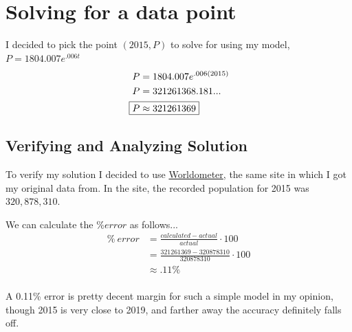 \documentclass[12pt]{article}
\begin{document}
\section{Solving for a data point}
I decided to pick the point $(2015, P)$ to solve for using my model, $P=1804.007e^{.006t}$
\begin{align}
  P         & =1804.007e^{.006\left(2015\right)} \\
  P         & =321261368.181...                  \\
  \Aboxed{P & \approx321261369}
\end{align}
\setcounter{equation}{0}

\subsection{Verifying and Analyzing Solution}
To verify my solution I decided to use \href{https://www.worldometers.info/world-population/us-population/}{Worldometer}, the same site in which I got my original data from. In the site, the recorded population for 2015 was $320,878,310$.

We can calculate the $\%error$ as follows...
\begin{align}
  \%\:error & = \frac{calculated-actual}{actual}\cdot100     \\
            & =\frac{321261369-320878310}{320878310}\cdot100 \\
            & \approx\boxed{.11\%}                           \\
\end{align}

A 0.11\% error is pretty decent margin for such a simple model in my opinion, though 2015 is very close to 2019, and farther away the accuracy definitely falls off.
\end{document}
